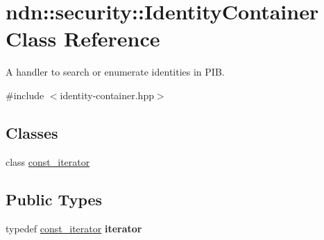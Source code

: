 \hypertarget{classndn_1_1security_1_1IdentityContainer}{}\section{ndn\+:\+:security\+:\+:Identity\+Container Class Reference}
\label{classndn_1_1security_1_1IdentityContainer}


A handler to search or enumerate identities in P\+IB.  




{\ttfamily \#include $<$identity-\/container.\+hpp$>$}

\subsection*{Classes}
\begin{DoxyCompactItemize}
\item 
class \hyperlink{classndn_1_1security_1_1IdentityContainer_1_1const__iterator}{const\+\_\+iterator}
\end{DoxyCompactItemize}
\subsection*{Public Types}
\begin{DoxyCompactItemize}
\item 
typedef \hyperlink{classndn_1_1security_1_1IdentityContainer_1_1const__iterator}{const\+\_\+iterator} {\bfseries iterator}\hypertarget{classndn_1_1security_1_1IdentityContainer_ac8ceed1ae05987319a2507554b7c2f3c}{}\label{classndn_1_1security_1_1IdentityContainer_ac8ceed1ae05987319a2507554b7c2f3c}

\end{DoxyCompactItemize}
